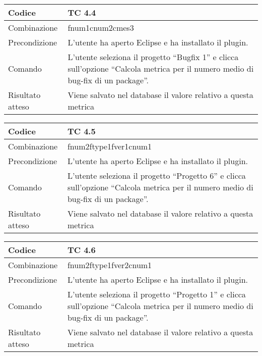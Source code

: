 \begin{table}[ht]
\begin{tabular}{|p{3cm}|p{9cm}|}
\hline
\cellcolor{lightgray}Codice				& TC 4.4								\\
\hline
\cellcolor{lightgray}Combinazione		& fnum1cnum2cmes3								\\
\hline
\cellcolor{lightgray}Precondizione		& L'utente ha aperto Eclipse e ha installato il plugin.			\\
\hline
\cellcolor{lightgray}Comando			& L'utente seleziona il progetto ``Bugfix 1''  e clicca sull'opzione ``Calcola metrica per il numero medio di bug-fix di un package''.	\\
\hline
\cellcolor{lightgray}Risultato atteso	& Viene salvato nel database il valore relativo a questa metrica	\\
\hline
\end{tabular}
\end{table}

\begin{table}[ht]
\begin{tabular}{|p{3cm}|p{9cm}|}
\hline
\cellcolor{lightgray}Codice				& TC 4.5								\\
\hline
\cellcolor{lightgray}Combinazione		& fnum2ftype1fver1cnum1 									\\
\hline
\cellcolor{lightgray}Precondizione		& L'utente ha aperto Eclipse e ha installato il plugin.			\\
\hline
\cellcolor{lightgray}Comando			& L'utente seleziona il progetto ``Progetto 6''  e clicca sull'opzione ``Calcola metrica per il numero medio di bug-fix di un package''.	\\
\hline
\cellcolor{lightgray}Risultato atteso	& Viene salvato nel database il valore relativo a questa metrica	\\
\hline
\end{tabular}
\end{table}

\begin{table}[ht]
\begin{tabular}{|p{3cm}|p{9cm}|}
\hline
\cellcolor{lightgray}Codice				& TC 4.6								\\
\hline
\cellcolor{lightgray}Combinazione		& fnum2ftype1fver2cnum1								\\
\hline
\cellcolor{lightgray}Precondizione		& L'utente ha aperto Eclipse e ha installato il plugin.				\\
\hline
\cellcolor{lightgray}Comando			& L'utente seleziona il progetto ``Progetto 1''  e clicca sull'opzione ``Calcola metrica per il numero medio di bug-fix di un package''.	\\
\hline
\cellcolor{lightgray}Risultato atteso	& Viene salvato nel database il valore relativo a questa metrica	\\
\hline
\end{tabular}
\end{table}

